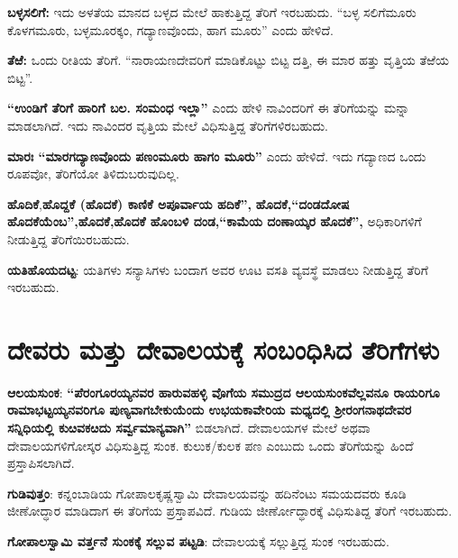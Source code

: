 \textbf{ಬಳ್ಳಸಲಿಗೆ:} ಇದು ಅಳತೆಯ ಮಾನದ ಬಳ್ಳದ ಮೇಲೆ ಹಾಕುತ್ತಿದ್ದ ತೆರಿಗೆ ಇರಬಹುದು. “ಬಳ್ಳ ಸಲಿಗೆಮೂರು ಕೊಳಗಮೂರು, ಬಳ್ಳಮೂರಕ್ಕಂ, ಗದ್ಯಾಣವೊಂದು, ಹಾಗ ಮೂರು” ಎಂದು ಹೇಳಿದೆ.

\textbf{ತೆಱೆ: } ಒಂದು ರೀತಿಯ ತೆರಿಗೆ. “ನಾರಾಯಣದೇವರಿಗೆ ಮಾಡಿಕೊಟ್ಟು ಬಿಟ್ಟ ದತ್ತಿ, ಈ ಮಾರ ಹತ್ತು ವೃತ್ತಿಯ ತೆಱೆಯ ಬಿಟ್ಟ”.

\textbf{“ಉಂಡಿಗೆ ತೆರಿಗೆ ಹಾರಿಗೆ ಬಲ. ಸಂಮಂಧ ಇಲ್ಲಾ”} ಎಂದು ಹೇಳಿ\textbf{ }ನಾವಿಂದರಿಗೆ ಈ ತೆರಿಗೆಯನ್ನು ಮನ್ನಾ ಮಾಡಲಾಗಿದೆ. ಇದು ನಾವಿಂದರ ವೃತ್ತಿಯ ಮೇಲೆ ವಿಧಿಸುತ್ತಿದ್ದ ತೆರಿಗೆಗಳಿರಬಹುದು. 

\textbf{ಮಾರಃ “ಮಾರಗದ್ಯಾಣವೊಂದು ಪಣಂಮೂರು ಹಾಗಂ ಮೂರು”} ಎಂದು ಹೇಳಿದೆ. ಇದು ಗದ್ಯಾಣದ ಒಂದು ರೂಪವೋ, ತೆರಿಗೆಯೋ ತಿಳಿದುಬರುವುದಿಲ್ಲ.

\textbf{ಹೊದಿಕೆ},\textbf{ಹೊದ್ದಕೆ (ಹೊದಕೆ) ಕಾಣಿಕೆ ಅಪೂರ್ವಾಯ ಹದಿಕೆ”, }\textbf{ಹೊದಕೆ,}\textbf{“ದಂಡದೋಷ ಹೊದಕೆಯೆಂಬ”,}\textbf{ಹೊದಕೆ,}\textbf{ಹೊದಕೆ ಹೊಂಬಳಿ ದಂಡ,}\textbf{“ಕಾಮೆಯ ದಂಣಾಯ್ಕರ ಹೊದಕೆ”,} ಅಧಿಕಾರಿಗಳಿಗೆ ನೀಡುತ್ತಿದ್ದ ತೆರಿಗೆಯಿರಬಹುದು.

\textbf{ಯತಿಹೊಯದಟ್ಟ}: ಯತಿಗಳು ಸನ್ಯಾಸಿಗಳು ಬಂದಾಗ ಅವರ ಊಟ ವಸತಿ ವ್ಯವಸ್ಥೆ ಮಾಡಲು ನೀಡುತ್ತಿದ್ದ ತೆರಿಗೆ ಇರಬಹುದು.


\section{ದೇವರು ಮತ್ತು ದೇವಾಲಯಕ್ಕೆ ಸಂಬಂಧಿಸಿದ ತೆರಿಗೆಗಳು}

\textbf{ಆಲಯಸುಂಕ}: \textbf{“ಪೆರಂಗೂರಯ್ಯನವರ ಹಾರುವಹಳ್ಳಿ ವೊಗೆಯ ಸಮುದ್ರದ ಆಲಯಸುಂಕವೆಲ್ಲವನೂ ರಾಯರಿಗೂ ರಾಮಾಭಟ್ಟಯ್ಯನವರಿಗೂ ಪುಣ್ಯವಾಗಬೇಕುಯೆಂದು ಉಭಯಕಾವೇರಿಯ ಮಧ್ಯದಲ್ಲಿ ಶ‍್ರೀರಂಗನಾಥದೇವರ ಸನ್ನಿಧಿಯಲ್ಲಿ ಕುೞವಕೞದು ಸರ್ವ್ವಮಾನ್ಯವಾಗಿ”} ಬಿಡಲಾಗಿದೆ. ದೇವಾಲಯಗಳ ಮೇಲೆ ಅಥವಾ ದೇವಾಲಯಗಳಿಗೋಸ್ಕರ ವಿಧಿಸುತ್ತಿದ್ದ ಸುಂಕ. ಕುಲುಕ/ಕುಲಕ ಪಣ ಎಂಬುದು ಒಂದು ತೆರಿಗೆಯನ್ನು ಹಿಂದೆ ಪ್ರಸ್ತಾಪಿಸಲಾಗಿದೆ. 

\textbf{ಗುಡಿವುತ್ತಂ}: ಕನ್ನಂಬಾಡಿಯ ಗೋಪಾಲಕೃಷ್ಣಸ್ವಾಮಿ ದೇವಾಲಯವನ್ನು ಹದಿನೆಂಟು ಸಮಯದವರು ಕೂಡಿ ಜೀಣೋದ್ಧಾರ ಮಾಡಿದಾಗ ಈ ತೆರಿಗೆಯ ಪ್ರಸ್ತಾಪವಿದೆ. ಗುಡಿಯ ಜೀರ್ಣೋದ್ಧಾರಕ್ಕೆ ವಿಧಿಸುತಿದ್ದ ತೆರಿಗೆ ಇರಬಹುದು.

\textbf{ಗೋಪಾಲಸ್ವಾಮಿ ವರ್ತ್ತನೆ ಸುಂಕಕ್ಕೆ ಸಲ್ಲುವ ಪಟ್ಟಡಿ}: ದೇವಾಲಯಕ್ಕೆ ಸಲ್ಲುತ್ತಿದ್ದ ಸುಂಕ ಇರಬಹುದು.


